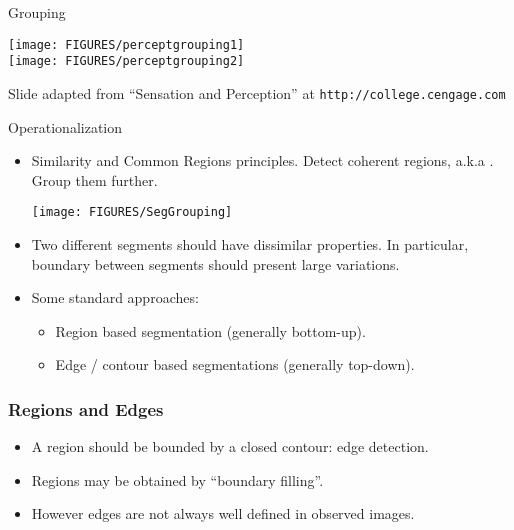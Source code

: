 \documentclass[9pt]{beamer}
\newcommand{\myemph}[1]{{\color{blue}{#1}}}
\begin{document}
\begin{frame}[t]{Grouping}
  \begin{center}
    \texttt{[image: FIGURES/perceptgrouping1]}\\
    \texttt{[image: FIGURES/perceptgrouping2]}\\
  \end{center}
  \vfill
  {\fontsize{6}{6}\selectfont Slide adapted from ``Sensation and Perception'' at \texttt{http://college.cengage.com}}
\end{frame}

\begin{frame}[t]{Operationalization}
  \begin{itemize}
  \item Similarity and Common Regions principles. Detect coherent regions, a.k.a \myemph{segments}. Group them further.
    \begin{center}
      \texttt{[image: FIGURES/SegGrouping]}
    \end{center}
  \item Two different segments should have dissimilar properties. In
    particular, boundary between segments should present large
    variations.\vfill
  \item Some standard approaches: \vfill
    \begin{itemize}
    \item Region based segmentation (generally bottom-up). \vfill
    \item Edge / contour based segmentations (generally top-down).\vfill
    \end{itemize}
  \end{itemize}
\end{frame}




\begin{frame}
  \frametitle{Regions and Edges}
  \begin{itemize}
  \item A region should be bounded by a closed contour: edge
    detection.
  \item Regions may be obtained by ``boundary filling''.\vfill
  \item However edges are not always well defined in observed images. 
  \end{itemize}
  \pause
  \begin{center}
  \end{center}
\end{frame}
\end{document}
